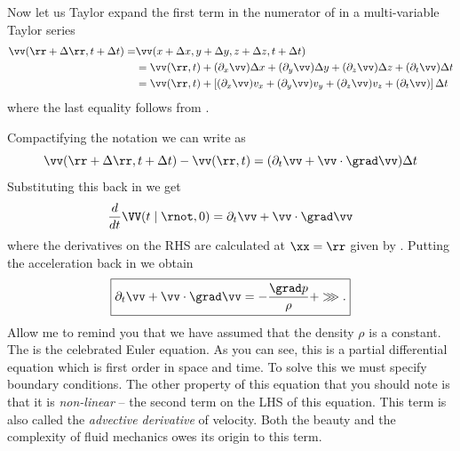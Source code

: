 \begin{fullwidth}
Now let us Taylor expand the first term in the numerator of
 in a multi-variable Taylor series
\begin{eqnarray}
\vv(\rr+\Delta \rr,t+\Delta t)=& 
\vv(x+\Delta x,y+\Delta y, z+\Delta z,
t+\Delta t) \nonumber \\
&=\vv(\rr,t) + (\partial_x\vv)\Delta x + 
(\partial_y\vv)\Delta y +
(\partial_z\vv)\Delta z +
(\partial_t\vv)\Delta t  \nonumber \\   
&= \vv(\rr,t) +  \left[(\partial_x\vv)v_x + 
(\partial_y\vv)v_y +
(\partial_z\vv)v_z +
(\partial_t\vv) \right]\Delta t 
\label{A2.1:euler5}
\end{eqnarray}
where the last equality follows from .
\end{fullwidth}
Compactifying the notation we can write 
as
\begin{equation}
\vv(\rr+\Delta \rr,t+\Delta t) - \vv(\rr,t) = (\partial_t \vv+ \vv\cdot\grad\vv)\Delta t
\end{equation}
Substituting this back in  we get
\begin{equation}
\frac{d}{dt} \VV(t\mid\rnot,0) = \partial_t \vv + \vv\cdot\grad\vv
\end{equation}
where the derivatives on the RHS are calculated at $\xx=\rr$ given by
. 
Putting the acceleration back in  we obtain
\begin{equation}
\boxed{
 \partial_t \vv + \vv\cdot\grad\vv  = -\frac{\grad p}{\rho} + \ggg \/.
}
\label{A2.1:Euler}
\end{equation}
Allow me to remind you that we have assumed that the density $\rho$ is
a constant. The  is the celebrated Euler equation. As you
can see, this is a partial differential equation which is first order
in space and time. To solve this we must specify boundary conditions. 
The other property of this equation that you should note is that it is
\textit{non-linear} -- the second term on the LHS of this
equation. This term is also called the \textit{advective derivative}
of velocity. Both the beauty and the complexity of  fluid mechanics
owes its origin to this term. 
